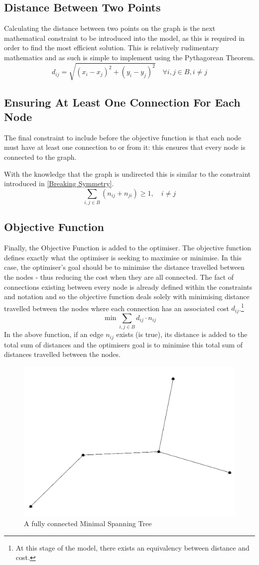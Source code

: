 \subsection{Distance Between Two Points}\label{Distance Between Two Points}
Calculating the distance between two points on the graph is the next mathematical constraint to be introduced into the model, as this is required in order to find the most efficient solution. This is relatively rudimentary mathematics and as such is simple to implement using the Pythagorean Theorem.
\[
d_{ij}=\sqrt{(x_i-x_j)^2 +(y_i-y_j)^2} \quad \forall i,j\in B, i\neq j
\]
\subsection{Ensuring At Least One Connection For Each Node}\label{Ensuring At Least One Connection For Each Node}
The final constraint to include before the objective function is that each node must have at least one connection to or from it: this ensures that every node is connected to the graph.

With the knowledge that the graph is undirected this is similar to the constraint introduced in \ref{Breaking Symmetry}.
\[
\sum_{i,j \in B} ( n_{ij} + n_{ji}) \geq 1, \quad i\neq j
\]

\subsection{Objective Function}\label{Objective Function}
Finally, the Objective Function is added to the optimiser. The objective function defines exactly what the optimiser is seeking to maximise or minimise. In this case, the optimiser's goal should be to minimise the distance travelled between the nodes - thus reducing the cost when they are all connected. The fact of connections existing between every node is already defined within the constraints and notation and so the objective function deals solely with minimising distance travelled between the nodes where each connection has an associated cost $d_{ij}$.\footnote{At this stage of the model, there exists an equivalency between distance and cost.}
\[
\min \sum_{i,j\in B}d_{ij}\cdot n_{ij}
\]
In the above function, if an edge $n_{ij}$ exists (is true), its distance is added to the total sum of distances and the optimisers goal is to minimise this total sum of distances travelled between the nodes.

\begin{figure}[H]
    \centering
    \includegraphics[width=0.35\linewidth]{protoAworking.png}
    \caption{A fully connected Minimal Spanning Tree}
    \label{fig:Fully connected Minimal Spanning Tree}
\end{figure}

